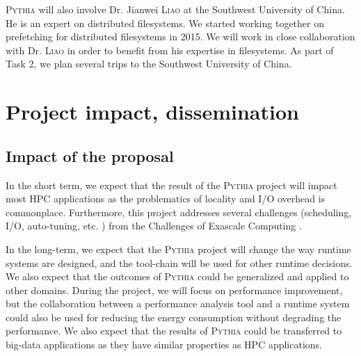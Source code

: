 \documentclass[a4paper,11pt,defblank]{article}
\newcommand{\pname}{\textsc{Pythia}\xspace}
\begin{document}
\pname will also involve Dr. Jianwei \textsc{Liao} at the Southwest
University of China. He is an expert on distributed filesystems.  We
started working together on prefetching for distributed filesystems in
2015. We will work in close collaboration with Dr. \textsc{Liao} in
order to benefit from his expertise in filesystems. As part of Task 2,
we plan several trips to the Southwest University of China.
\vspace{0.3cm}

\section{Project impact, dissemination}




\subsection{Impact of the proposal}

In the short term, we expect that the result of the \pname project
will impact most HPC applications as the problematics of locality and
I/O overhead is commonplace.
%
Furthermore, this project addresses several challenges (scheduling,
I/O, auto-tuning, etc. ) from the Challenges of Exascale Computing
\cite{exascale_challenges}.

In the long-term, we expect that the \pname project will change the
way runtime systems are designed, and the tool-chain will be used for
other runtime decisions. We also expect that the outcomes of \pname
could be generalized and applied to other domains. During the project,
we will focus on performance improvement, but the collaboration
between a performance analysis tool and a runtime system could also be
used for reducing the energy consumption without degrading the
performance. We also expect that the results of \pname could be
transferred to big-data applications as they have similar properties
as HPC applications.
\end{document}
